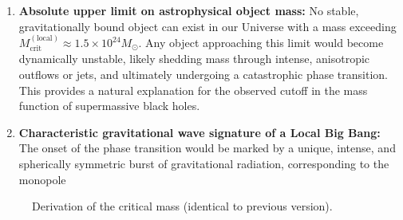 \documentclass[12pt,a4paper]{article}
\begin{document}
	\begin{enumerate}
		\item \textbf{Absolute upper limit on astrophysical object mass:} No stable, gravitationally bound object can exist in our Universe with a mass exceeding \(M_{\mathrm{crit}}^{\mathrm{(local)}} \approx 1.5 \times 10^{24} M_{\odot}\). Any object approaching this limit would become dynamically unstable, likely shedding mass through intense, anisotropic outflows or jets, and ultimately undergoing a catastrophic phase transition. This provides a natural explanation for the observed cutoff in the mass function of supermassive black holes.
		
		\item \textbf{Characteristic gravitational wave signature of a Local Big Bang:} The onset of the phase transition would be marked by a unique, intense, and spherically symmetric burst of gravitational radiation, corresponding to the monopole
	\end{enumerate}
	
	\begin{figure}[!ht]
		\centering
		\caption{Derivation of the critical mass (identical to previous version).}
		\label{fig:critical-mass}
	\end{figure}
	
\end{document}
